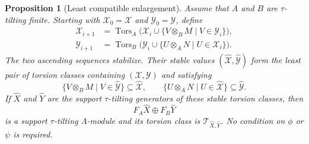 \documentclass[11pt,reqno]{amsart}
\newtheorem{proposition}[theorem]{Proposition}
\theoremstyle{definition}
\theoremstyle{remark}
\numberwithin{equation}{section}
\begin{document}
\begin{proposition}[Least compatible enlargement]
\label{prop:finite-closure}
Assume that $A$ and $B$ are $\tau$-tilting finite.  Starting with
$\mathcal X_0=\mathcal X$ and $\mathcal Y_0=\mathcal Y$, define
\begin{align*}
 \mathcal X_{i+1}
 &=\operatorname{Tors}_A\bigl(
     \mathcal X_i\cup
     \{V\otimes_BM\mid V\in\mathcal Y_i\}\bigr),\\
 \mathcal Y_{i+1}
 &=\operatorname{Tors}_B\bigl(
     \mathcal Y_i\cup
     \{U\otimes_AN\mid U\in\mathcal X_i\}\bigr).
\end{align*}
The two ascending sequences stabilize.  Their stable values
$(\widehat{\mathcal X},\widehat{\mathcal Y})$ form the least pair of torsion
classes containing $(\mathcal X,\mathcal Y)$ and satisfying
\[
 \{V\otimes_BM\mid V\in\widehat{\mathcal Y}\}
 \subseteq\widehat{\mathcal X},
 \qquad
 \{U\otimes_AN\mid U\in\widehat{\mathcal X}\}
 \subseteq\widehat{\mathcal Y}.
\]
If $\widehat X$ and $\widehat Y$ are the support $\tau$-tilting
generators of these stable torsion classes, then
\[
 F_A\widehat X\oplus F_B\widehat Y
\]
is a support $\tau$-tilting $\Lambda$-module and its torsion class is
$\mathcal T_{\widehat X,\widehat Y}$.  No condition on $\phi$ or $\psi$ is
required.
\end{proposition}
\end{document}
